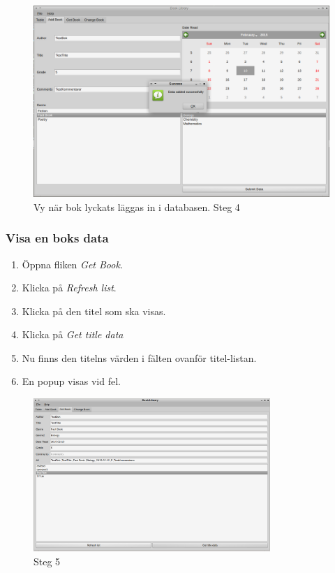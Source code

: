 \documentclass[11pt, titlepage, oneside, a4paper]{article}
\newcommand{\Subsubsection}[1]{\vspace{-4pt}\subsubsection{#1}\vspace{-8pt}}
\begin{document}
           \begin{figure}[h!]
        \includegraphics[width=1\textwidth]{add_book}
        \caption{Vy när bok lyckats läggas in i databasen. Steg 4}
        \label{fig:add_book}
        \end{figure}
		
        \newpage
        
        \Subsubsection{Visa en boks data}
        \begin{enumerate}
		\item Öppna fliken \emph{Get Book}.
        \item Klicka på \emph{Refresh list}.
        \item Klicka på den titel som ska visas.
        \item Klicka på \emph{Get title data}
        \item Nu finns den titelns värden i fälten ovanför titel-listan.
  		\item En popup visas vid fel.
		\end{enumerate} 
       	
        
          \begin{figure}[h!]
        \includegraphics[width=0.8\textwidth]{get_book}
        \caption{Steg 5}
        \label{fig:add_book}
        \end{figure}
		
\end{document}
